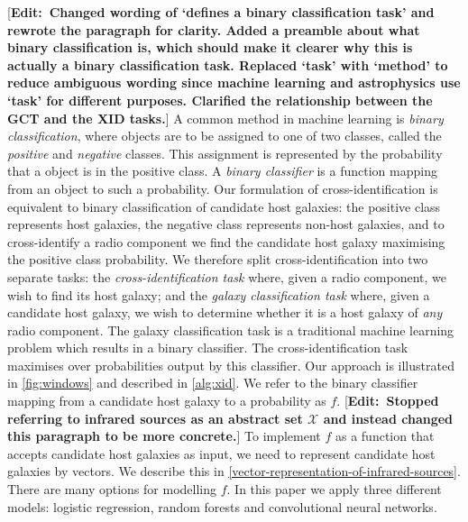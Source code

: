 \documentclass[fleqn,usenatbib,usedcolumn]{mnras}
\newcommand{\edit}[1]{ {\color{red}[{\bf Edit:~{#1}}]} }
\begin{document}
    \edit{Changed wording of `defines a binary classification task' and rewrote the paragraph for clarity. Added a preamble about what binary classification is, which should make it clearer why this is actually a binary classification task. Replaced `task' with `method' to reduce ambiguous wording since machine learning and astrophysics use `task' for different purposes. Clarified the relationship between the GCT and the XID tasks.} A common method in machine learning is \emph{binary classification}, where objects are to be assigned to one of two classes, called the \emph{positive} and \emph{negative} classes. This assignment is represented by the probability that a object is in the positive class. A \emph{binary classifier} is a function mapping from an object to such a probability. Our formulation of cross-identification is equivalent to binary classification of candidate host galaxies: the positive class represents host galaxies, the negative class represents non-host galaxies, and to cross-identify a radio component we find the candidate host galaxy maximising the positive class probability. We therefore split cross-identification into two separate tasks: the \emph{cross-identification task} where, given a radio component, we wish to find its host galaxy; and the \emph{galaxy classification task} where, given a candidate host galaxy, we wish to determine whether it is a host galaxy of \emph{any} radio component. The galaxy classification task is a traditional machine learning problem which results in a binary classifier. The cross-identification task maximises over probabilities output by this classifier. Our approach is illustrated in \autoref{fig:windows} and described in \autoref{alg:xid}. We refer to the binary classifier mapping from a candidate host galaxy to a probability as $f$. \edit{Stopped referring to infrared sources as an abstract set $\mathcal X$ and instead changed this paragraph to be more concrete.} To implement $f$ as a function that accepts candidate host galaxies as input, we need to represent candidate host galaxies by vectors. We describe this in \autoref{vector-representation-of-infrared-sources}. There are many options for modelling $f$. In this paper we apply three different models: logistic regression, random forests and convolutional neural networks.
\end{document}
